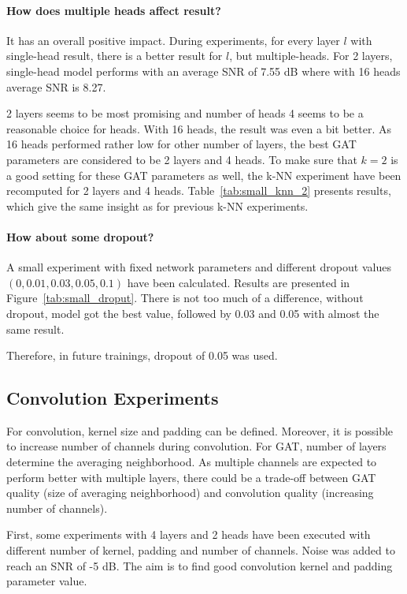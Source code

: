 \paragraph{How does multiple heads affect result?}
It has an overall positive impact. 
During experiments, for every layer $l$ with single-head result, there is a better result for $l$, but multiple-heads. 
For 2 layers, single-head model performs with an average SNR of 7.55 dB where with 16 heads average SNR is 8.27.

2 layers seems to be most promising and number of heads 4 seems to be a reasonable choice for heads.
With 16 heads, the result was even a bit better. As 16 heads performed rather low for other number of layers, 
the best GAT parameters are considered to be 2 layers and 4 heads.
To make sure that $k=2$ is a good setting for these GAT parameters as well, the k-NN experiment
have been recomputed for 2 layers and 4 heads. Table~\ref{tab:small_knn_2} presents results, which 
give the same insight as for previous k-NN experiments.

\paragraph{How about some dropout?}
A small experiment with fixed network parameters
and different dropout values $(0, 0.01, 0.03, 0.05, 0.1)$ have been calculated. 
Results are presented in Figure~\ref{tab:small_droput}.
There is not too much of a difference, without dropout, model got the best value, followed by 
0.03 and 0.05 with almost the same result. 

Therefore, in future trainings, dropout of 0.05 was used.

\subsection{Convolution Experiments}

For convolution, kernel size and padding can be defined.
Moreover, it is possible to increase number of channels during convolution. 
For GAT, number of layers determine the averaging neighborhood.
As multiple channels are expected to perform better with multiple layers,
there could be a trade-off between GAT quality (size of averaging neighborhood) and convolution quality (increasing number of channels). 

First, some experiments with 4 layers and 2 heads have been executed with different number of kernel, padding and number of channels.
Noise was added to reach an SNR of -5 dB.
The aim is to find good convolution kernel and padding parameter value.

